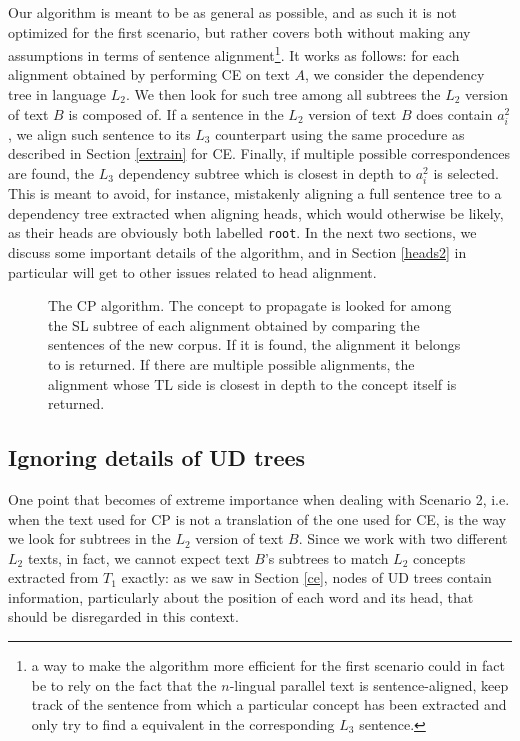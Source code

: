 Our algorithm is meant to be as general as possible, and as such it is not optimized for the first scenario, but rather covers both without making any assumptions in terms of sentence alignment\footnote{a way to make the algorithm more efficient for the first scenario could in fact be to rely on the fact that the $n$-lingual parallel text is sentence-aligned, keep track of the sentence from which a particular concept has been extracted and only try to find a equivalent in the corresponding $L_3$ sentence.}. 
It works as follows: for each alignment obtained by performing CE on text $A$, we consider the dependency tree in language $L_2$. We then look for such tree among all subtrees the $L_2$ version of text $B$ is composed of. If a sentence in the $L_2$ version of text $B$ does contain $a_i^2$, we align such sentence to its $L_3$ counterpart using the same procedure as described in Section \ref{extrain} for CE. Finally, if multiple possible correspondences are found, the $L_3$ dependency subtree which is closest in depth to $a_i^2$ is selected. This is meant to avoid, for instance, mistakenly aligning a full sentence tree to a dependency tree extracted when aligning heads, which would otherwise be likely, as their heads are obviously both labelled \texttt{root}. In the next two sections, we discuss some important details of the algorithm, and in Section \ref{heads2} in particular will get to other issues related to head alignment.

\begin{figure}[H]
    \centering
    
    \caption[The CP algorithm]{The CP algorithm. The concept to propagate is looked for among the SL subtree of each alignment obtained by comparing the sentences of the new corpus. If it is found, the alignment it belongs to is returned. If there are multiple possible alignments, the alignment whose TL side is closest in depth to the concept itself is returned.}
    \label{prop}
\end{figure}

\subsection{Ignoring details of UD trees}
One point that becomes of extreme importance when dealing with Scenario 2, i.e. when the text used for CP is not a translation of the one used for CE, is the way we look for subtrees in the $L_2$ version of text $B$. Since we work with two different $L_2$ texts, in fact, we cannot expect text $B$'s subtrees to match $L_2$ concepts extracted from $T_1$ exactly: as we saw in Section \ref{ce}, nodes of UD trees contain information, particularly about the position of each word and its head, that should be disregarded in this context.\smallskip 

